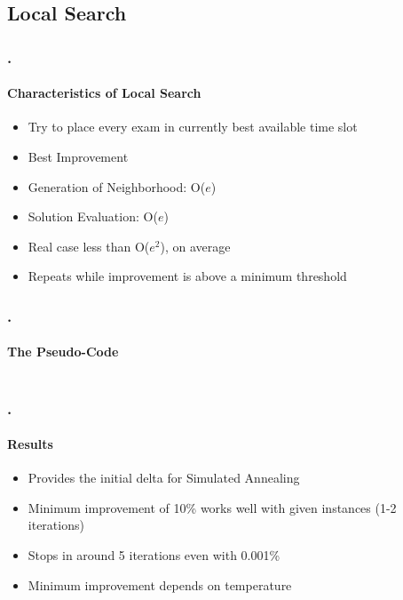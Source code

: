 \documentclass{beamer}
\begin{document}
	

   \subsection{Local Search}
   
   \begin{frame}
   \frametitle{\thesection.\thesubsection \ \insertsubsection}
   \framesubtitle{Characteristics of Local Search}
   	
   \begin{itemize}
   	\item Try to place every exam in currently best available time slot
   	\item Best Improvement
   	\item Generation of Neighborhood: O($e$)
   	\item Solution Evaluation: O($e$)
   	\item Real case less than O($e^2$), on average
   	\item Repeats while improvement is above a minimum threshold
   \end{itemize}
 
\end{frame}

	\begin{frame}
	   \frametitle{\thesection.\thesubsection \ \insertsubsection}
	   \framesubtitle{The Pseudo-Code}
	   	\begin{columns}[onlytextwidth]
\end{columns}
	\end{frame}

\begin{frame}
\frametitle{\thesection.\thesubsection \ \insertsubsection}
\framesubtitle{Results}

\begin{itemize}
	\item Provides the initial delta for Simulated Annealing
	\item Minimum improvement of 10\% works well with given instances (1-2 iterations)
	\item Stops in around 5 iterations even with 0.001\%
	\item Minimum improvement depends on temperature %
\end{itemize}

\end{frame}
\end{document}

